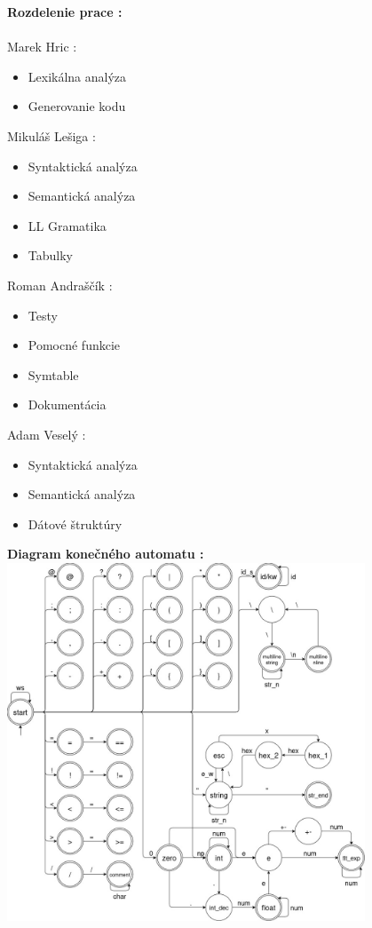 \documentclass[12pt]{article}
\begin{document}
\noindent \Large \textbf{Rozdelenie prace :} \\
\noindent\makebox[\linewidth]{\rule{\textwidth}{0.4pt}}
\newline \\
\large Marek Hric : 
\normalsize
\begin{itemize}
\item Lexikálna analýza
\item Generovanie kodu
\end{itemize}
\large Mikuláš Lešiga :
\normalsize
\begin{itemize}
\item Syntaktická analýza
\item Semantická analýza
\item LL Gramatika
\item Tabulky
\end{itemize}
\large Roman Andraščík :
\normalsize
\begin{itemize}
\item Testy
\item Pomocné funkcie
\item Symtable
\item Dokumentácia
\end{itemize}
\large Adam Veselý :
\normalsize
\begin{itemize}
\item Syntaktická analýza
\item Semantická analýza
\item Dátové štruktúry
\end{itemize}
 
\newpage

\noindent \Large \textbf{Diagram konečného automatu :}
\newline \\

\includegraphics[width=0.8\textwidth,scale=0.5]{fsm}
\end{document}

